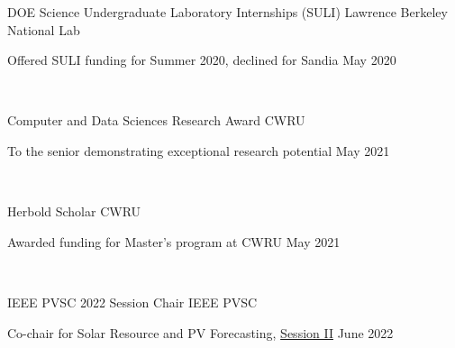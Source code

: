 \documentclass[10pt]{article}
\begin{document}
	
%		  


 {
	
{ 
	DOE Science Undergraduate Laboratory Internships (SULI)} 
\hspace*{0pt}\hfill Lawrence Berkeley National Lab

Offered SULI funding for Summer 2020, declined for Sandia \hspace*{0pt}\hfill May 2020

\

%
%
{ 
Computer and Data Sciences Research Award} 
\hspace*{0pt}\hfill CWRU 

To the senior demonstrating exceptional research potential \hspace*{0pt}\hfill May 2021

\

{ 
Herbold Scholar} 
\hspace*{0pt}\hfill CWRU 

Awarded funding for Master's program at CWRU \hspace*{0pt}\hfill May 2021

\

{ 
IEEE PVSC 2022 Session Chair} 
\hspace*{0pt}\hfill IEEE PVSC 

Co-chair for Solar Resource and PV Forecasting,  \href{https://ieee-pvsc.org/PVSC49/program-full.php?page=program&displayday=6&pads=&start_range=&start_interval=&changing_days=yes&hide_details=}{Session II} \hspace*{0pt}\hfill June 2022

}
\end{document}

